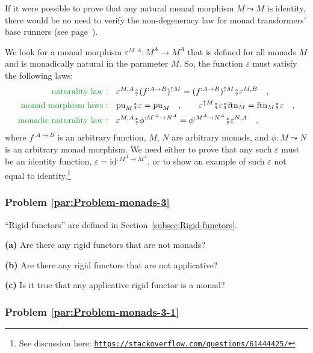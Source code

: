 If it were possible to prove that any natural monad morphism $M\leadsto M$
is identity, there would be no need to verify the non-degeneracy law
for monad transformers\textsf{'} base runners (see page~\pageref{par:Open-question-monad-id-trans}). 

We look for a monad morphism $\varepsilon^{M,A}:M^{A}\rightarrow M^{A}$
that is defined for all monads $M$ and is monadically natural in
the parameter $M$. So, the function $\varepsilon$ must satisfy the
following laws:
\begin{align*}
{\color{greenunder}\text{naturality law}:}\quad & \varepsilon^{M,A}\bef(f^{:A\rightarrow B})^{\uparrow M}=(f^{:A\rightarrow B})^{\uparrow M}\bef\varepsilon^{M,B}\quad,\\
{\color{greenunder}\text{monad morphism laws}:}\quad & \text{pu}_{M}\bef\varepsilon=\text{pu}_{M}\quad,\quad\quad\varepsilon^{\uparrow M}\bef\varepsilon\bef\text{ftn}_{M}=\text{ftn}_{M}\bef\varepsilon\quad,\\
{\color{greenunder}\text{monadic naturality law}:}\quad & \varepsilon^{M,A}\bef\phi^{:M^{:A}\rightarrow N^{A}}=\phi^{:M^{A}\rightarrow N^{A}}\bef\varepsilon^{N,A}\quad,
\end{align*}
where $f^{:A\rightarrow B}$ is an arbitrary function, $M$, $N$
are arbitrary monads, and $\phi:M\leadsto N$ is an arbitrary monad
morphism. We need either to prove that any such $\varepsilon$ must
be an identity function, $\varepsilon=\text{id}^{:M^{A}\rightarrow M^{A}}$,
or to show an example of such $\varepsilon$ not equal to identity.\footnote{See discussion here: \texttt{\href{https://stackoverflow.com/questions/61444425/}{https://stackoverflow.com/questions/61444425/}}}

\subsubsection{Problem \label{par:Problem-monads-3}\ref{par:Problem-monads-3}}

\textsf{``}Rigid functors\textsf{''} are defined in Section~\ref{subsec:Rigid-functors}.

\textbf{(a)} Are there any rigid functors that are not monads? 

\textbf{(b)} Are there any rigid functors that are not applicative?

\textbf{(c)} Is it true that any applicative rigid functor is a monad?

\subsubsection{Problem \label{par:Problem-monads-3-1}\ref{par:Problem-monads-3-1}}

